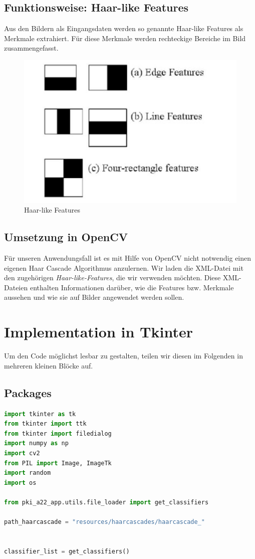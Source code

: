 \documentclass{article}
\begin{document}
\subsection{Funktionsweise: Haar-like Features}
Aus den Bildern als Eingangsdaten werden so genannte Haar-like Features
als Merkmale extrahiert. Für diese Merkmale werden rechteckige Bereiche
im Bild zusammengefasst.

\begin{figure}
	\centering
	\includegraphics[width=0.7\linewidth]{foto1}
	\caption{Haar-like Features}
	\label{fig:foto1}
\end{figure}


\newpage
\subsection{Umsetzung in OpenCV}
Für unseren Anwendungsfall ist es mit Hilfe von OpenCV nicht notwendig einen eigenen Haar Cascade  Algorithmus anzulernen. Wir laden die XML-Datei mit den zugehörigen \textit{Haar-like-Features}, die wir verwenden möchten. Diese XML-Dateien enthalten Informationen darüber, wie die Features bzw. Merkmale aussehen und wie sie auf Bilder angewendet werden sollen. 



\newpage
\section{Implementation in Tkinter}
Um den Code möglichst lesbar zu gestalten, teilen wir diesen im Folgenden in mehreren kleinen Blöcke auf.
\subsection{Packages}

\begin{lstlisting}[language=Python, label = {lst:code}, mathescape= true]
import tkinter as tk
from tkinter import ttk
from tkinter import filedialog
import numpy as np
import cv2
from PIL import Image, ImageTk
import random
import os

from pki_a22_app.utils.file_loader import get_classifiers

path_haarcascade = "resources/haarcascades/haarcascade_"


classifier_list = get_classifiers()
\end{lstlisting}
\end{document}
